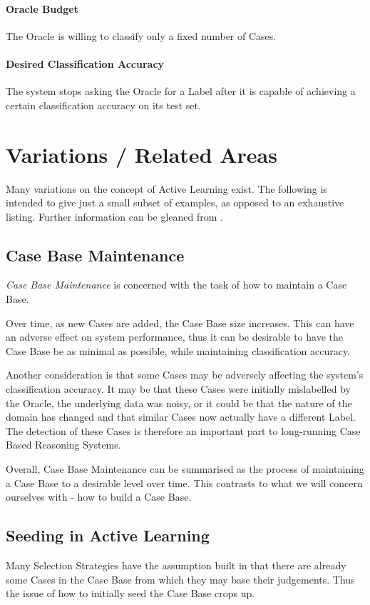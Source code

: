 \documentclass[a4paper,11pt]{report}
\begin{document}
\paragraph{Oracle Budget} 
The Oracle is willing to classify only a fixed number of Cases.

\paragraph{Desired Classification Accuracy} 
The system stops asking the Oracle for a Label after it is capable of achieving a certain classification accuracy on its test set.

\section{Variations / Related Areas}
Many variations on the concept of Active Learning exist. The following is intended to give just a small subset of examples, as opposed to an exhaustive listing. Further information can be gleaned from \citet{Settles2010}.

\subsection{Case Base Maintenance}
\emph{Case Base Maintenance} is concerned with the task of how to maintain a Case Base. 

Over time, as new Cases are added, the Case Base size increases. This can have an adverse effect on system performance, thus it can be desirable to have the Case Base be as minimal as possible, while maintaining classification accuracy.

Another consideration is that some Cases may be adversely affecting the system's classification accuracy. It may be that these Cases were initially mislabelled by the Oracle, the underlying data was noisy, or it could be that the nature of the domain has changed and that similar Cases now actually have a different Label. The detection of these Cases is therefore an important part to long-running Case Based Reasoning Systems.

Overall, Case Base Maintenance can be summarised as the process of maintaining a Case Base to a desirable level over time. This contrasts to what we will concern ourselves with - how to build a Case Base.

\subsection{Seeding in Active Learning}
Many Selection Strategies have the assumption built in that there are already some Cases in the Case Base from which they may base their judgements. Thus the issue of how to initially seed the Case Base crops up.
\end{document}
